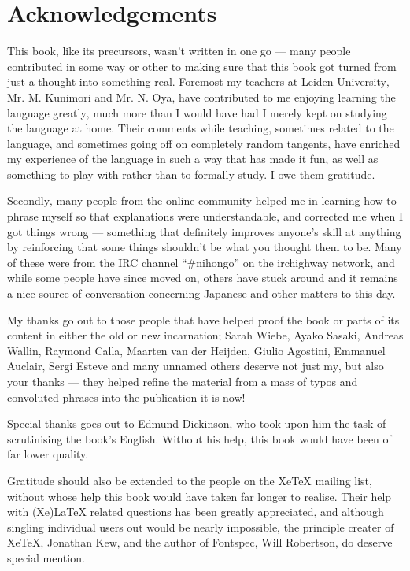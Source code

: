 \documentclass[11pt, b5paper, twoside, openright, onecolumn]{book}
\begin{document}
	\cleardoublepage

	\renewcommand\contentsname{Table of Contents}
	\setcounter{tocdepth}{2}
	\tableofcontents

	
\chapter*{Acknowledgements}

This book‚ like its precursors‚ wasn’t written in one go — many people contributed in some way or other to making sure that this book got turned from just a thought into something real. Foremost my teachers at Leiden University‚ Mr. M. Kunimori and Mr. N. Oya‚ have contributed to me enjoying learning the language greatly‚ much more than I would have had I merely kept on studying the language at home. Their comments while teaching‚ sometimes related to the language‚ and sometimes going off on completely random tangents‚ have enriched my experience of the language in such a way that has made it fun‚ as well as something to play with rather than to formally study. I owe them gratitude.

Secondly‚ many people from the online community helped me in learning how to phrase myself so that explanations were understandable‚ and corrected me when I got things wrong — something that definitely improves anyone’s skill at anything by reinforcing that some things shouldn’t be what you thought them to be. Many of these were from the IRC channel “\#nihongo” on the irchighway network‚ and while some people have since moved on‚ others have stuck around and it remains a nice source of conversation concerning Japanese and other matters to this day.

My thanks go out to those people that have helped proof the book or parts of its content in either the old or new incarnation; Sarah Wiebe‚ Ayako Sasaki‚ Andreas Wallin‚ Raymond Calla‚ Maarten van der Heijden‚ Giulio Agostini‚ Emmanuel Auclair‚ Sergi Esteve and many unnamed others deserve not just my‚ but also your thanks — they helped refine the material from a mass of typos and convoluted phrases into the publication it is now!

Special thanks goes out to Edmund Dickinson‚ who took upon him the task of scrutinising the book’s English. Without his help‚ this book would have been of far lower quality.

Gratitude should also be extended to the people on the XeTeX mailing list‚ without whose help this book would have taken far longer to realise. Their help with (Xe)LaTeX related questions has been greatly appreciated‚ and although singling individual users out would be nearly impossible‚ the principle creater of XeTeX‚ Jonathan Kew‚ and the author of Fontspec‚ Will Robertson‚ do deserve special mention.
\end{document}
